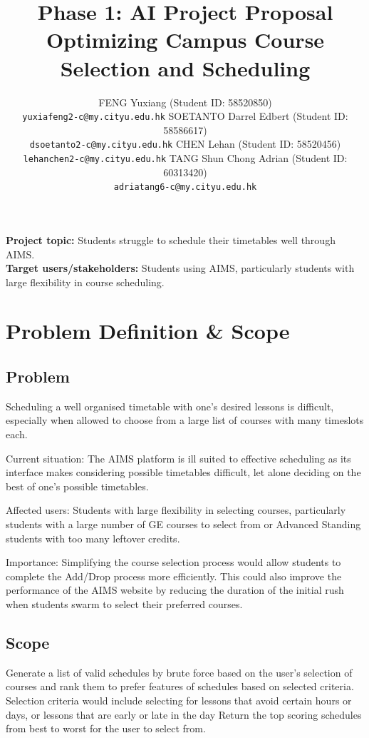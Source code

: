\documentclass{article}
\title{Phase 1: AI Project Proposal\\
\large Optimizing Campus Course Selection and Scheduling}
\author{
  FENG Yuxiang (Student ID: 58520850)\\
  \texttt{yuxiafeng2-c@my.cityu.edu.hk}
  \And 
  SOETANTO Darrel Edbert (Student ID: 58586617)\\
  \texttt{dsoetanto2-c@my.cityu.edu.hk}
  \AND
  CHEN Lehan (Student ID: 58520456)\\
  \texttt{lehanchen2-c@my.cityu.edu.hk}
  \And
  TANG Shun Chong Adrian (Student ID: 60313420)\\
  \texttt{adriatang6-c@my.cityu.edu.hk}
}
\begin{document}
\maketitle

\noindent\textbf{Project topic:} Students struggle to schedule their timetables well through AIMS.\\
\textbf{Target users/stakeholders:} Students using AIMS, particularly students with large flexibility in course scheduling.


\section{Problem Definition \& Scope}
\subsection{Problem}
Scheduling a well organised timetable with one’s desired lessons is difficult, especially when allowed to choose from a large list of courses with many timeslots each.

Current situation: The AIMS platform is ill suited to effective scheduling as its interface makes considering possible timetables difficult, let alone deciding on the best of one’s possible timetables.

Affected users: Students with large flexibility in selecting courses, particularly students with a large number of GE courses to select from or Advanced Standing students with too many leftover credits.

Importance: Simplifying the course selection process would allow students to complete the Add/Drop process more efficiently. This could also improve the performance of the AIMS website by reducing the duration of the initial rush when students swarm to select their preferred courses.

\subsection{Scope}Generate a list of valid schedules by brute force based on the user’s selection of courses and rank them to prefer features of schedules based on selected criteria. Selection criteria would include selecting for lessons that avoid certain hours or days, or lessons that are early or late in the day Return the top scoring schedules from best to worst for the user to select from.
\end{document}
